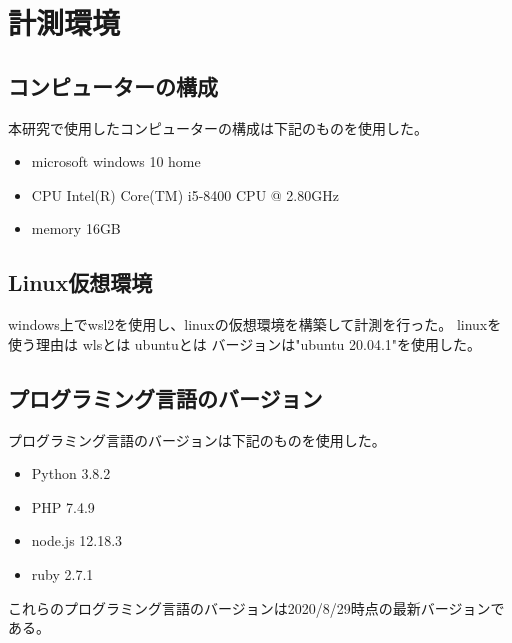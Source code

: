 \chapter{計測環境}
\label{cha:environment}
\section{コンピューターの構成}
本研究で使用したコンピューターの構成は下記のものを使用した。
\begin{itemize}
  \item microsoft windows 10 home
  \item CPU Intel(R) Core(TM) i5-8400 CPU @ 2.80GHz
  \item memory 16GB
\end{itemize}

\section{Linux仮想環境}
windows上でwsl2を使用し、linuxの仮想環境を構築して計測を行った。
linuxを使う理由は
wlsとは
ubuntuとは
バージョンは"ubuntu 20.04.1"を使用した。

\section{プログラミング言語のバージョン}
プログラミング言語のバージョンは下記のものを使用した。
\begin{itemize}
  \item Python 3.8.2
  \item PHP 7.4.9
　\item node.js 12.18.3
  \item ruby 2.7.1
\end{itemize}
これらのプログラミング言語のバージョンは2020/8/29時点の最新バージョンである。